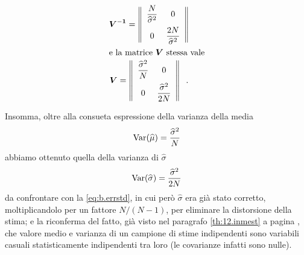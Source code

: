 \begin{gather*}
  \boldsymbol{V}^\mathbf{-1} = \left\|
    \begin{array}{cc}
      \tabtop \dfrac{N}{\widehat \sigma^2} & 0 \\[2ex]
      \tabbot 0 & \dfrac{2 N}{\widehat \sigma^2}
    \end{array}
  \right\| \\
  \intertext{e la matrice $\boldsymbol{V}$ stessa vale}
  \boldsymbol{V} = \left\|
    \begin{array}{cc}
      \tabtop \dfrac{\widehat \sigma^2}{N} & 0 \\[2ex]
      \tabbot 0 & \dfrac{\widehat \sigma^2}{2 N}
    \end{array}
  \right\| \peq .
\end{gather*}

Insomma, oltre alla consueta espressione della varianza
della media
\begin{equation*}
  \operatorname{Var}( \widehat \mu ) = \frac{\widehat \sigma^2}{N}
\end{equation*}
abbiamo ottenuto quella della varianza di $\widehat \sigma$
\begin{equation*}
  \operatorname{Var}( \widehat \sigma ) = \frac{\widehat \sigma^2}{2 N}
\end{equation*}
da confrontare con la \eqref{eq:b.errstd}, in cui per\`o
$\widehat \sigma$ era gi\`a stato corretto, moltiplicandolo
per un fattore $N/(N-1)$, per eliminare la distorsione della
stima; e la riconferma del fatto, gi\`a visto nel paragrafo
\ref{th:12.inmest} a pagina \pageref{th:12.inmest}, che
valore medio e varianza di un campione di stime indipendenti
sono variabili casuali statisticamente indipendenti tra loro
(le covarianze infatti sono nulle).%
%

\endinput
